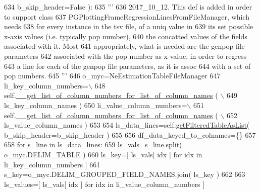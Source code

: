 \begin{DoxyCode}
634                                                 b\_skip\_header=\textcolor{keyword}{False} ):
635         \textcolor{stringliteral}{'''}
636 \textcolor{stringliteral}{        2017\_10\_12. This def is added in order to support class }
637 \textcolor{stringliteral}{        PGPlottingFrameRegressionLinesFromFileManager, which needs}
638 \textcolor{stringliteral}{        for every instance in the tsv file, of a uniq value in }
639 \textcolor{stringliteral}{        its set possible x-axis values (i.e. typically pop number), }
640 \textcolor{stringliteral}{        the concatted values of the fields associated with it. Most}
641 \textcolor{stringliteral}{        appropriately, what is needed are the genpop file parameters}
642 \textcolor{stringliteral}{        associated with the pop number as x-value, in order to regress}
643 \textcolor{stringliteral}{        a line for each of the genpop file parameters, as it is assoc}
644 \textcolor{stringliteral}{        with a set of pop numbers.}
645 \textcolor{stringliteral}{        '''}
646         o\_myc=NeEstimationTableFileManager
647         li\_key\_column\_numbers=\(\backslash\)
648                 self.\hyperlink{classnegui_1_1pgneestimationtablefilemanager_1_1NeEstimationTableFileManager_ae3085e4c3eba74c7e5a0d80648793616}{\_\_get\_list\_of\_column\_numbers\_for\_list\_of\_column\_names}
      ( \(\backslash\)
649                                                         ls\_key\_column\_names )
650         li\_value\_column\_numbers=\(\backslash\)
651                 self.\hyperlink{classnegui_1_1pgneestimationtablefilemanager_1_1NeEstimationTableFileManager_ae3085e4c3eba74c7e5a0d80648793616}{\_\_get\_list\_of\_column\_numbers\_for\_list\_of\_column\_names}
      ( \(\backslash\)
652                                                         ls\_value\_column\_names )
653 
654         ls\_data\_lines=self.\hyperlink{classnegui_1_1pgneestimationtablefilemanager_1_1NeEstimationTableFileManager_adb06c0cd0ae4870590638905c8ea05a9}{getFilteredTableAsList}( b\_skip\_header=b\_skip\_header )
655         
656         df\_data\_keyed\_to\_colnames=\{\}
657 
658         \textcolor{keywordflow}{for} s\_line \textcolor{keywordflow}{in} ls\_data\_lines:
659             ls\_vals=s\_line.split( o\_myc.DELIM\_TABLE ) 
660             ls\_key=[ ls\_vals[ idx ]  \textcolor{keywordflow}{for} idx \textcolor{keywordflow}{in} li\_key\_column\_numbers ]     
661             s\_key=o\_myc.DELIM\_GROUPED\_FIELD\_NAMES.join( ls\_key )
662 
663             ls\_values=[ ls\_vals[ idx ] \textcolor{keywordflow}{for} idx \textcolor{keywordflow}{in} li\_value\_column\_numbers ]

\end{DoxyCode}
